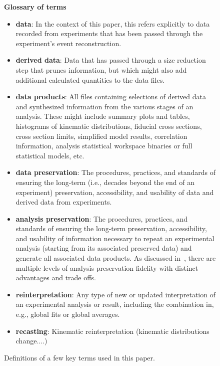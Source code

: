 \documentclass[11pt]{article}
\begin{document}
\begin{figure}[!ht]
\begin{tcolorbox}
\begin{center}
{\large \textbf{Glossary of terms}}
\end{center}
%
\begin{itemize}
    \item \textbf{\Gls{data}}: In the context of this paper, this refers explicitly to data recorded from experiments that has been passed through the experiment's event reconstruction.
    \item \textbf{\Gls{derived data}}: Data that has passed through a size reduction step that prunes information, but which might also add additional calculated quantities to the data files.
    \item \textbf{\Glspl{data product}}: All files containing selections of derived data and synthesized information from the various stages of an analysis.
These might include summary plots and tables, histograms of kinematic distributions, fiducial cross sections, cross section limits, simplified model results, correlation information, analysis statistical workspace binaries or full statistical models, etc.
    \item \textbf{\Gls{data preservation}}: The procedures, practices, and standards of ensuring the long-term (i.e., decades beyond the end of an experiment) preservation, accessibility, and usability of data and derived data from experiments.
    \item \textbf{\Gls{analysis preservation}}: The procedures, practices, and standards of ensuring the long-term preservation, accessibility, and usability of information necessary to repeat an experimental analysis (starting from its associated preserved data) and generate all associated \glspl{data product}.
    As discussed in~, there are multiple levels of analysis preservation fidelity with distinct advantages and trade offs.
    \item \textbf{\Gls{reinterpretation}}: Any type of new or updated interpretation of an experimental analysis or result, including the combination in, e.g., global fits or global averages. 
    \item \textbf{\Gls{recasting}}: Kinematic reinterpretation (kinematic distributions change....) %
\end{itemize}
\end{tcolorbox}
\caption{Definitions of a few key terms used in this paper.}
\label{fig:glossary}
\end{figure}
\end{document}
